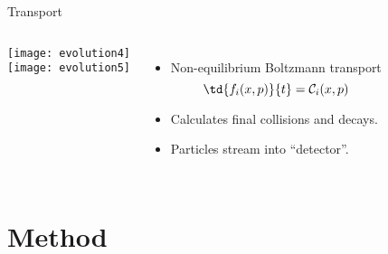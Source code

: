 \documentclass{beamer}
\begin{document}
\begin{frame}{Transport}
  \begin{columns}
    \centering
    \texttt{[image: evolution4]} \\
    \texttt{[image: evolution5]}

    \begin{itemize}
      \item Non-equilibrium Boltzmann transport
        \begin{equation*}
          \td{f_i(x,p)}{t} = \mathcal C_i(x,p)
        \end{equation*}
      \item Calculates final collisions and decays.
      \item Particles stream into ``detector''.
    \end{itemize}
  \end{columns}
\end{frame}




\section{Method}
\end{document}
